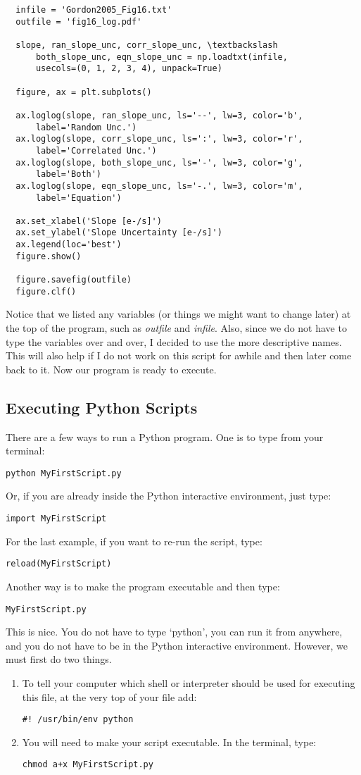 \begin{verbatim}
  infile = 'Gordon2005_Fig16.txt'
  outfile = 'fig16_log.pdf'
 
  slope, ran_slope_unc, corr_slope_unc, \textbackslash 
      both_slope_unc, eqn_slope_unc = np.loadtxt(infile, 
      usecols=(0, 1, 2, 3, 4), unpack=True) 

  figure, ax = plt.subplots()

  ax.loglog(slope, ran_slope_unc, ls='--', lw=3, color='b', 
      label='Random Unc.')
  ax.loglog(slope, corr_slope_unc, ls=':', lw=3, color='r', 
      label='Correlated Unc.')
  ax.loglog(slope, both_slope_unc, ls='-', lw=3, color='g', 
      label='Both')
  ax.loglog(slope, eqn_slope_unc, ls='-.', lw=3, color='m', 
      label='Equation')

  ax.set_xlabel('Slope [e-/s]')
  ax.set_ylabel('Slope Uncertainty [e-/s]')
  ax.legend(loc='best')
  figure.show()
 
  figure.savefig(outfile)
  figure.clf()
\end{verbatim}

Notice that we listed any variables (or things we might want to change
later) at the top of the program, such as \textit{outfile} and \textit{infile}.
Also, since we do not have to type the variables over and over, I
decided to use the more descriptive names.  This will also help if I
do not work on this script for awhile and then later come back to it.
Now our program is ready to execute.

\subsection{Executing Python Scripts}

There are a few ways to run a Python program.  One is to type from your terminal:

\texttt{\termtab python MyFirstScript.py}

Or, if you are already inside the Python interactive environment, just
type:

\texttt{\pytab import MyFirstScript}

For the last example, if you want to re-run the script, type:

\texttt{\pytab reload(MyFirstScript)}

Another way is to make the program executable and then type:

\texttt{\termtab MyFirstScript.py}

This is nice.  You do not have to type `python', you can run it from
anywhere, and you do not have to be in the Python interactive
environment.  However, we must first do two things.
\begin{enumerate}
\item To tell your computer which shell or interpreter should be used
  for executing this file, at the very top of your file add:

  \texttt{\#! /usr/bin/env python}

\item You will need to make your script executable.  In the terminal,
  type:

  \texttt{\termtab chmod a+x MyFirstScript.py}  
\end{enumerate}

